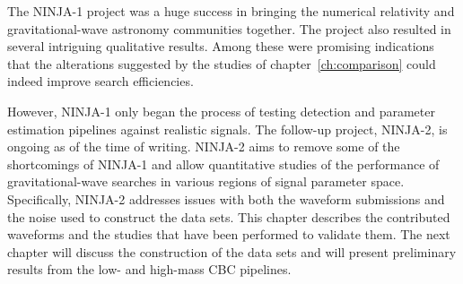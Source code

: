 

The NINJA-1 project was a huge success in bringing the numerical
relativity and gravitational-wave astronomy communities together.  The
project also resulted in several intriguing qualitative results.
Among these were promising indications that the alterations suggested 
by the studies of chapter~\ref{ch:comparison} could indeed improve
search efficiencies.

However, NINJA-1 only began the process of testing detection and
parameter estimation pipelines against realistic signals.  The
follow-up project, NINJA-2, is ongoing as of the time of writing.
NINJA-2 aims to remove some of the shortcomings of NINJA-1 and allow
quantitative studies of the performance of gravitational-wave searches
in various regions of signal parameter space.  Specifically, NINJA-2
addresses issues with both the waveform submissions and the noise used
to construct the data sets.  This chapter describes the contributed
waveforms and the studies that have been performed to validate them.
The next chapter will discuss the construction of the data sets and
will present preliminary results from the low- and high-mass CBC
pipelines.


